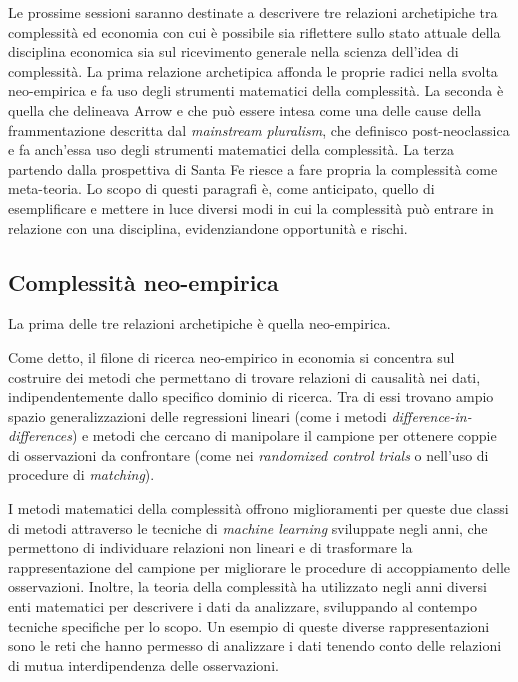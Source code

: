 \documentclass[a4paper, headings=standardclasses]{scrartcl}
\begin{document}
Le prossime sessioni saranno destinate a descrivere tre relazioni archetipiche tra complessità ed economia con cui è possibile sia riflettere sullo stato attuale della disciplina economica sia sul ricevimento generale nella scienza dell'idea di complessità.
La prima relazione archetipica affonda le proprie radici nella svolta neo-empirica e fa uso degli strumenti matematici della complessità. La seconda è quella che delineava Arrow e che può essere intesa come una delle cause della frammentazione descritta dal \textit{mainstream pluralism}, che definisco post-neoclassica e fa anch'essa uso degli strumenti matematici della complessità.
La terza partendo dalla prospettiva di Santa Fe riesce a fare propria la complessità come meta-teoria.
Lo scopo di questi paragrafi è, come anticipato, quello di esemplificare e mettere in luce diversi modi in cui la complessità può entrare in relazione con una disciplina, evidenziandone opportunità e rischi.

\subsection{Complessità neo-empirica}
La prima delle tre relazioni archetipiche è quella neo-empirica.

Come detto, il filone di ricerca neo-empirico in economia si concentra sul costruire dei metodi che permettano di trovare relazioni di causalità nei dati, indipendentemente dallo specifico dominio di ricerca. Tra di essi trovano ampio spazio generalizzazioni delle regressioni lineari (come i metodi \textit{difference-in-differences}) e metodi che cercano di manipolare il campione per ottenere coppie di osservazioni da confrontare (come nei \textit{randomized control trials} o nell'uso di procedure di \textit{matching}).

I metodi matematici della complessità offrono miglioramenti per queste due classi di metodi attraverso le tecniche di \textit{machine learning} sviluppate negli anni, che permettono di individuare relazioni non lineari e di trasformare la rappresentazione del campione per migliorare le procedure di accoppiamento delle osservazioni.
Inoltre, la teoria della complessità ha utilizzato negli anni diversi enti matematici per descrivere i dati da analizzare, sviluppando al contempo tecniche specifiche per lo scopo.
Un esempio di queste diverse rappresentazioni sono le reti che hanno permesso di analizzare i dati tenendo conto delle relazioni di mutua interdipendenza delle osservazioni.
\end{document}
